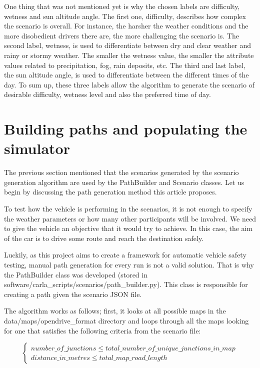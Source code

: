 One thing that was not mentioned yet is why the chosen labels are difficulty, wetness and sun altitude angle. The first one, difficulty, describes how complex the scenario is overall. For instance, the harsher the weather conditions and the more disobedient drivers there are, the more challenging the scenario is. The second label, wetness, is used to differentiate between dry and clear weather and rainy or stormy weather. The smaller the wetness value, the smaller the attribute values related to precipitation, fog, rain deposits, etc. The third and last label, the sun altitude angle, is used to differentiate between the different times of the day. To sum up, these three labels allow the algorithm to generate the scenario of desirable difficulty, wetness level and also the preferred time of day.

\section{Building paths and populating the simulator} \label{sect-5.3}

The previous section mentioned that the scenarios generated by the scenario generation algorithm are used by the PathBuilder and Scenario classes. Let us begin by discussing the path generation method this article proposes. 

To test how the vehicle is performing in the scenarios, it is not enough to specify the weather parameters or how many other participants will be involved. We need to give the vehicle an objective that it would try to achieve. In this case, the aim of the car is to drive some route and reach the destination safely.

Luckily, as this project aims to create a framework for automatic vehicle safety testing, manual path generation for every run is not a valid solution. That is why the PathBuilder class was developed (stored in  software/carla\_scripts/scenarios/path\_builder.py). This class is responsible for creating a path given the scenario JSON file.

The algorithm works as follows; first, it looks at all possible maps in the data/maps/opendrive\_format directory and loops through all the maps looking for one that satisfies the following criteria from the scenario file: 

\begin{equation} \label{requirements_for_map}
\begin{cases}
    number\_of\_junctions \le total\_number\_of\_unique\_junctions\_in\_map \\
    distance\_in\_metres \le total\_map\_road\_length
    \end{cases}
\end{equation}

